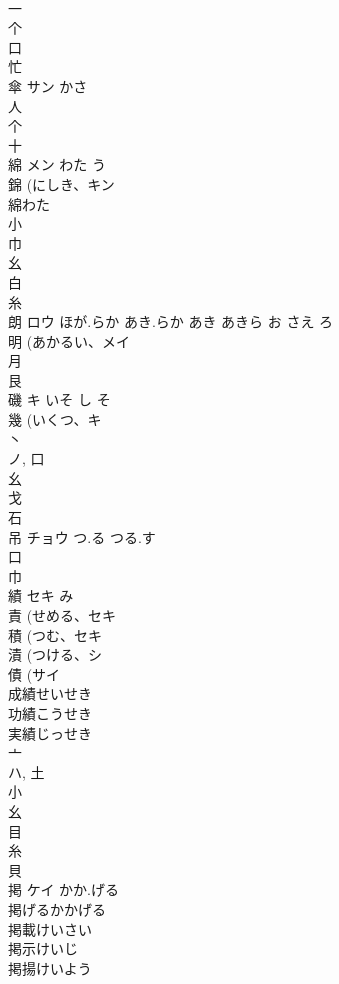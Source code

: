 \documentclass[8pt]{extreport}
\begin{document}
\begin{CJK}{UTF8}{min}
\\	一 
\\	个 
\\	口 
\\	忙 
\\	傘	サン	かさ	
\\	人 
\\	个 
\\	十 
\\	綿	メン	わた う	
\\	錦 (にしき、キン 
\\	綿わた 
\\	小 
\\	巾 
\\	幺 
\\	白 
\\	糸 
\\	朗	ロウ	ほが.らか あき.らか あき あきら お さえ ろ	
\\	明 (あかるい、メイ 
\\	月 
\\	艮 
\\	磯	キ	いそ し そ	
\\	幾 (いくつ、キ 
\\	丶 
\\	ノ, 口 
\\	幺 
\\	戈 
\\	石 
\\	吊	チョウ	つ.る つる.す	
\\	口 
\\	巾 
\\	績	セキ	み	
\\	責 (せめる、セキ 
\\	積 (つむ、セキ 
\\	漬 (つける、シ 
\\	債 (サイ 
\\	成績せいせき
\\	功績こうせき
\\	実績じっせき
\\	亠 
\\	ハ, 土 
\\	小 
\\	幺 
\\	目 
\\	糸 
\\	貝 
\\	掲	ケイ	かか.げる	
\\	掲げるかかげる
\\	掲載けいさい
\\	掲示けいじ
\\	掲揚けいよう

\end{CJK}
\end{document}
